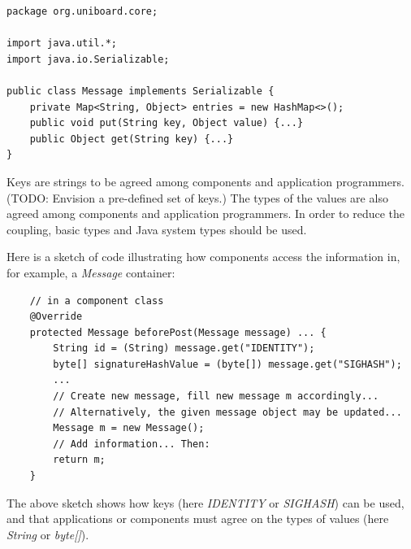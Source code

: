 \documentclass[oneside]{scrreprt}
\begin{document}
\begin{lstlisting}
package org.uniboard.core;

import java.util.*;
import java.io.Serializable;

public class Message implements Serializable {
    private Map<String, Object> entries = new HashMap<>();
    public void put(String key, Object value) {...}
    public Object get(String key) {...}
}
\end{lstlisting}

Keys are strings to be agreed among components and application
programmers. (TODO: Envision a pre-defined set of keys.)
The types of the values are also
agreed among components and application programmers.
In order to reduce the
coupling, basic types and Java system types should be used.

Here is a sketch of code illustrating how components access
the information in, for example, a \emph{Message} container:

\begin{lstlisting}
    // in a component class
    @Override
    protected Message beforePost(Message message) ... {
        String id = (String) message.get("IDENTITY");
        byte[] signatureHashValue = (byte[]) message.get("SIGHASH");
        ...
        // Create new message, fill new message m accordingly...
        // Alternatively, the given message object may be updated...
        Message m = new Message();
        // Add information... Then:
        return m;
    }
\end{lstlisting}

The above sketch shows how keys (here \emph{IDENTITY} or \emph{SIGHASH})
can be used, and that applications or components must agree on
the types of values (here \emph{String} or \emph{byte[]}).

% 
\end{document}
